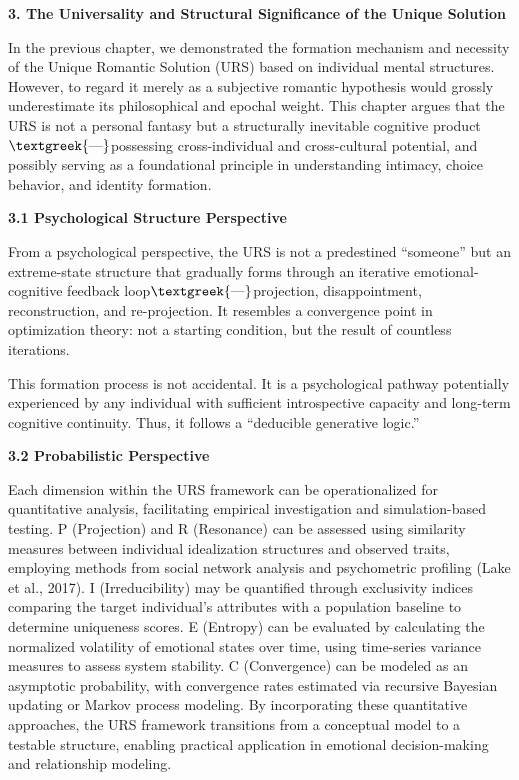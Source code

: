 \documentclass[a4paper]{article}
\begin{document}
{\centering\color[HTML]{595959}
\textbf{3. The Universality and Structural Significance of the Unique Solution}
\par}

In the previous chapter, we demonstrated the formation mechanism and necessity of the Unique Romantic Solution (URS)
based on individual mental structures. However, to regard it merely as a subjective romantic hypothesis would grossly
underestimate its philosophical and epochal weight. This chapter argues that the URS is not a personal fantasy but a
structurally inevitable cognitive product$\text{\textgreek{—}}$possessing cross-individual and cross-cultural
potential, and possibly serving as a foundational principle in understanding intimacy, choice behavior, and identity
formation.

\textbf{3.1 Psychological Structure Perspective}

From a psychological perspective, the URS is not a predestined “someone” but an extreme-state structure that gradually
forms through an iterative emotional-cognitive feedback loop$\text{\textgreek{—}}$projection, disappointment,
reconstruction, and re-projection. It resembles a convergence point in optimization theory: not a starting condition,
but the result of countless iterations.

This formation process is not accidental. It is a psychological pathway potentially experienced by any individual with
sufficient introspective capacity and long-term cognitive continuity. Thus, it follows a “deducible generative logic.”

\textbf{3.2 Probabilistic Perspective}

Each dimension within the URS framework can be operationalized for quantitative analysis, facilitating empirical
investigation and simulation-based testing. P (Projection) and R (Resonance) can be assessed using similarity measures
between individual idealization structures and observed traits, employing methods from social network analysis and
psychometric profiling (Lake et al., 2017). I (Irreducibility) may be quantified through exclusivity indices comparing
the target individual's attributes with a population baseline to determine uniqueness scores. E (Entropy) can be
evaluated by calculating the normalized volatility of emotional states over time, using time-series variance measures
to assess system stability. C (Convergence) can be modeled as an asymptotic probability, with convergence rates
estimated via recursive Bayesian updating or Markov process modeling. By incorporating these quantitative approaches,
the URS framework transitions from a conceptual model to a testable structure, enabling practical application in
emotional decision-making and relationship modeling.
\end{document}
